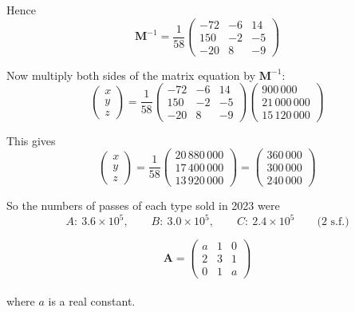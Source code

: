 \documentclass[leqno]{article}
\begin{document}
\begin{enumerate}[
  label=\textbf{\arabic*.},
  leftmargin=*,
  topsep=0pt,
  partopsep=0pt,
  parsep=0pt
]
\begin{djsSolution}
Hence
\[
\mathbf{M}^{-1}=\frac1{58}
\begin{pmatrix}
-72&-6&14\\
150&-2&-5\\
-20&8&-9
\end{pmatrix}
\]

Now multiply both sides of the matrix equation by \(\mathbf{M}^{-1}\):
\[
\begin{pmatrix}
x\\y\\z
\end{pmatrix}
=
\frac1{58}
\begin{pmatrix}
-72&-6&14\\
150&-2&-5\\
-20&8&-9
\end{pmatrix}
\begin{pmatrix}
900\,000\\21\,000\,000\\15\,120\,000
\end{pmatrix}
\]

This gives
\[
\begin{pmatrix}
x\\y\\z
\end{pmatrix}
=
\frac1{58}
\begin{pmatrix}
20\,880\,000\\17\,400\,000\\13\,920\,000
\end{pmatrix}
=
\begin{pmatrix}
360\,000\\300\,000\\240\,000
\end{pmatrix}
\]

So the numbers of passes of each type sold in 2023 were
\[
A:\ 3.6\times 10^5,\qquad B:\ 3.0\times 10^5,\qquad C:\ 2.4\times 10^5\qquad\text{(2 s.f.)}
\]
\end{djsSolution}


\newpage

\questionitem

\[
\mathbf{A} = \begin{pmatrix}
a & 1 & 0 \\
2 & 3 & 1 \\
0 & 1 & a
\end{pmatrix}
\] \\
where $a$ is a real constant. \\


\end{enumerate}
\end{document}

